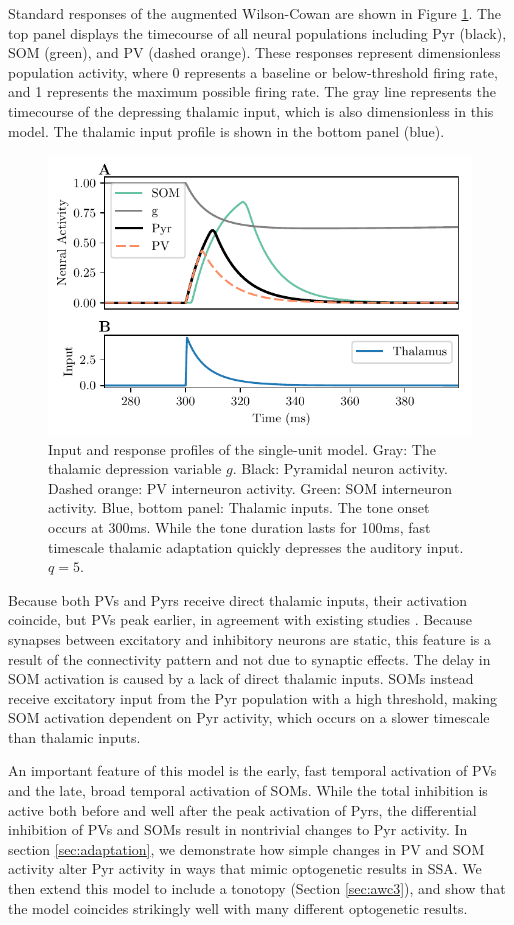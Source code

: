 \documentclass[a4paper,10pt]{article}
\begin{document}
Standard responses of the augmented Wilson-Cowan are shown in Figure \ref{fig:awc}. The top panel displays the timecourse of all neural populations including Pyr (black), SOM (green), and PV (dashed orange). These responses represent dimensionless population activity, where 0 represents a baseline or below-threshold firing rate, and 1 represents the maximum possible firing rate. The gray line represents the timecourse of the depressing thalamic input, which is also dimensionless in this model. The thalamic input profile is 
shown in the bottom panel (blue).

\begin{figure}[ht!]
\centering
\includegraphics[width=.75\textwidth]{rate_responses.pdf}
 \caption{Input and response profiles of the single-unit model. Gray: The thalamic depression variable $g$. Black: Pyramidal neuron activity. Dashed orange: PV interneuron activity. Green: SOM interneuron activity. Blue, bottom panel: Thalamic inputs. The tone onset occurs at 300ms. While the tone duration lasts for 100ms, fast timescale thalamic adaptation quickly depresses the auditory input. $q=5$.}\label{fig:awc}
\end{figure}


Because both PVs and Pyrs receive direct thalamic inputs, their activation coincide, but PVs peak earlier, in agreement with existing studies \cite{keller2018gap}. Because synapses between excitatory and inhibitory neurons are static, this feature is a result of the connectivity pattern and not due to synaptic effects. The delay in SOM activation is caused by a lack of direct thalamic inputs. SOMs instead receive excitatory input from the Pyr population with a high threshold, making SOM activation dependent on Pyr activity, which occurs on a slower timescale than thalamic inputs.

An important feature of this model is the early, fast temporal activation of PVs and the late, broad temporal activation of SOMs. While the total inhibition is active both before and well after the peak activation of Pyrs, the differential inhibition of PVs and SOMs result in nontrivial changes to Pyr activity. In section \ref{sec:adaptation}, we demonstrate how simple changes in PV and SOM activity alter Pyr activity in ways that mimic optogenetic results in SSA. We then extend this model to include a tonotopy (Section \ref{sec:awc3}), and show that the model coincides strikingly well with many different optogenetic results.
\end{document}
